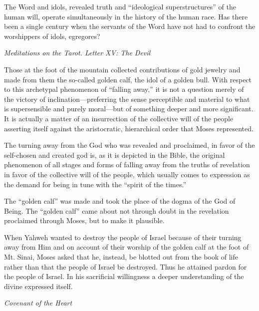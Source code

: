 \begin{quotationx}
The Word and idols, revealed truth and “ideological superstructures” of the human will, operate simultaneously in the
history of the human race. Has there been a single century when the servants of the Word have not had to confront the
worshippers of idols, egregores? \begin{flushright} \emph{Meditations on the Tarot. Letter XV: The Devil}\end{flushright}

\end{quotationx}

Those at the foot of the mountain collected contributions of gold jewelry and made from them the so-called golden calf,
the idol of a golden bull. With respect to this archetypal phenomenon of “falling away,” it is not a question merely of
the victory of inclination—preferring the sense perceptible and material to what is supersensible
and purely moral—but of something deeper and more significant. It is actually a matter of an
insurrection of the collective will of the people asserting itself against the aristocratic, hierarchical order that
Moses represented.

The turning away from the God who was revealed and proclaimed, in favor of the self-chosen and created god is, as it is
depicted in the Bible, the original phenomenon of all stages and forms of falling away from the truths of revelation in
favor of the collective will of the people, which usually comes to expression as the demand for being in tune with the
“spirit of the times.”

The “golden calf” was made and took the place of the dogma of the God of Being. The “golden calf” came about not through
doubt in the revelation proclaimed through Moses, but to make it plausible.

\begin{quotationx}
When Yahweh wanted to destroy the people of Israel because of their turning away from Him and on account of their
worship of the golden calf at the foot of Mt. Sinai, Moses asked that he, instead, be blotted out from the book of life
rather than that the people of Israel be destroyed. Thus he attained pardon for the people of Israel. In his
sacrificial willingness a deeper understanding of the divine expressed itself. \begin{flushright} \emph{Covenant of the Heart}\end{flushright}

\end{quotationx}

